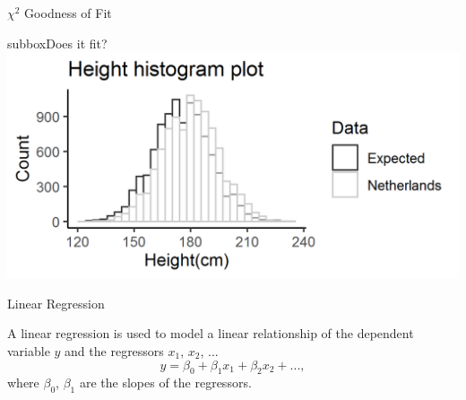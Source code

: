 \documentclass[10pt,a4paper]{article}
\begin{document}
\begin{multicols}{3}
\begin{textbox}{$\chi^2$ Goodness of Fit}
\begin{subbox}{subbox}{Does it fit?}
\includegraphics[width=\textwidth]{Figures/Distributions/GoF.png}
\end{subbox}
\end{textbox}

\begin{textbox}{Linear Regression}

A linear regression is used to model a linear relationship of the dependent variable $y$ and the regressors $x_1$, $x_2$, ...
	\[  y=\beta_0+\beta_1 x_{1} +\beta_2 x_{2}+..., \]
	where $\beta_0$, $\beta_1$ are the slopes of the regressors.


\end{textbox}
\end{multicols}
\end{document}
